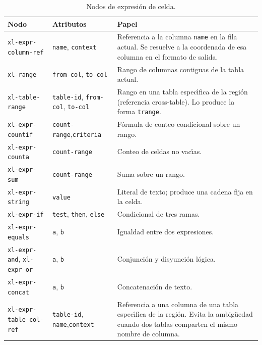 \begin{table}[h!]
\centering
\caption{Nodos de expresi\'on de celda.}
\label{tab:ast-expresiones}
\renewcommand{\arraystretch}{1.3}
\begin{tabular}{p{4.2cm} p{3.8cm} p{5.8cm}}
\toprule
\textbf{Nodo} & \textbf{Atributos} & \textbf{Papel} \\
\midrule
\texttt{xl-expr-column-ref}
  & \texttt{name}, \texttt{context}
  & Referencia a la columna \texttt{name} en la fila actual.
    Se resuelve a la coordenada de esa columna en el formato de salida. \\
\midrule
\texttt{xl-range}
  & \texttt{from-col}, \texttt{to-col}
  & Rango de columnas contiguas de la tabla actual. \\
\midrule
\texttt{xl-table-range}
  & \texttt{table-id},\newline
    \texttt{from-col}, \texttt{to-col}
  & Rango en una tabla espec\'{\i}fica de la regi\'on
    (referencia cross-table).  Lo produce la forma
    \texttt{trange}. \\
\midrule
\texttt{xl-expr-countif}
  & \texttt{count-range},\newline\texttt{criteria}
  & F\'ormula de conteo condicional sobre un rango. \\
\midrule
\texttt{xl-expr-counta}
  & \texttt{count-range}
  & Conteo de celdas no vac\'{\i}as. \\
\midrule
\texttt{xl-expr-sum}
  & \texttt{count-range}
  & Suma sobre un rango. \\
\midrule
\texttt{xl-expr-string}
  & \texttt{value}
  & Literal de texto; produce una cadena fija en la celda. \\
\midrule
\texttt{xl-expr-if}
  & \texttt{test}, \texttt{then}, \texttt{else}
  & Condicional de tres ramas. \\
\midrule
\texttt{xl-expr-equals}
  & \texttt{a}, \texttt{b}
  & Igualdad entre dos expresiones. \\
\midrule
\texttt{xl-expr-and}, \texttt{xl-expr-or}
  & \texttt{a}, \texttt{b}
  & Conjunci\'on y disyunci\'on l\'ogica. \\
\midrule
\texttt{xl-expr-concat}
  & \texttt{a}, \texttt{b}
  & Concatenaci\'on de texto. \\
\midrule
\texttt{xl-expr-table-col-ref}
  & \texttt{table-id}, \texttt{name},\newline\texttt{context}
  & Referencia a una columna de una tabla espec\'{\i}fica de la regi\'on.
    Evita la ambig\"uedad cuando dos tablas comparten el mismo nombre de
    columna. \\

\end{tabular}
\end{table}
